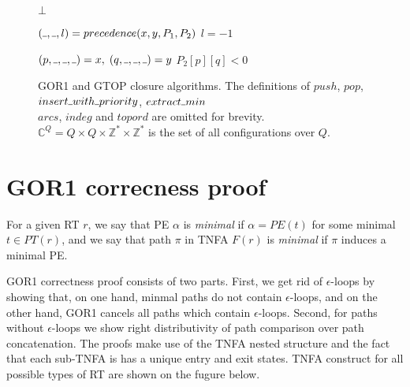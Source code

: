 \documentclass[AMA,STIX1COL]{WileyNJD-v2}
\newcommand{\Xund}{\rule{.4em}{.4pt}}
\newcommand{\YC}{\mathbb{C}}
\newcommand{\YZ}{\mathbb{Z}}
\begin{document}
\begin{figure*}
\begin{multicols}{2}
\begin{algorithm}[H]
{        \Return $\bot$
    }
    \end{algorithm}


    \begin{algorithm}[H] \DontPrintSemicolon {} 
     {
        $(\Xund, \Xund, l) = precedence (x, y, P_1, P_2)$ \;
        \Return $l = -1$ %
    }
    \end{algorithm}


    \begin{algorithm}[H] \DontPrintSemicolon {} 
     {
        $(p,\Xund,\Xund,\Xund) = x, \; (q,\Xund,\Xund,\Xund) = y$ \;
        \Return $P_2[p][q] < 0$ \;
    }
    \end{algorithm}
\end{multicols}
\vspace{-2em}
\begin{center}
\caption{GOR1 and GTOP closure algorithms.
The definitions of $push$, $pop$, $insert \Xund with \Xund priority$, $extract \Xund min$ \\
$arcs$, $indeg$ and $topord$ are omitted for brevity.
$\YC^Q = Q \times Q \times \YZ^* \times \YZ^*$ is the set of all configurations over $Q$.}
\end{center}
\end{figure*}


\clearpage
\pagebreak

\section{GOR1 correcness proof}

For a given RT $r$,
we say that PE $\alpha$ is \emph{minimal} if $\alpha = PE(t)$ for some minimal $t \in PT(r)$,
and we say that path $\pi$ in TNFA $F(r)$ is \emph{minimal} if $\pi$ induces a minimal PE.

GOR1 correctness proof consists of two parts.
First, we get rid of $\epsilon$-loops by showing that,
on one hand, minmal paths do not contain $\epsilon$-loops,
and on the other hand, GOR1 cancels all paths which contain $\epsilon$-loops.
Second, for paths without $\epsilon$-loops we show right distributivity of path comparison over path concatenation.
The proofs make use of the TNFA nested structure
and the fact that each sub-TNFA is has a unique entry and exit states.
TNFA construct for all possible types of RT are shown on the fugure below.
\end{document}
